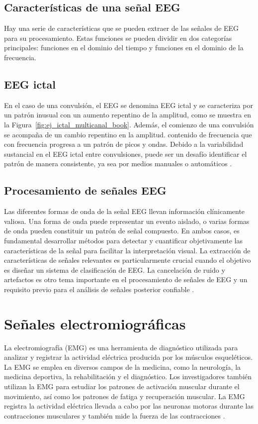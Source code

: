 \subsection{Características de una señal EEG}
Hay una serie de características que se pueden extraer de las señales de EEG para su procesamiento. Estas funciones se pueden dividir en dos categorías principales: funciones en el dominio del tiempo y funciones en el dominio de la frecuencia.

\subsection{EEG ictal}
En el caso de una convulsión, el EEG se denomina EEG ictal y se caracteriza por un patrón inusual con un aumento repentino de la amplitud, como se muestra en la Figura~\ref{fig:ej_ictal_multicanal_book}. Además, el comienzo de una convulsión se acompaña de un cambio repentino en la amplitud. contenido de frecuencia que con frecuencia progresa a un patrón de picos y ondas. Debido a la variabilidad sustancial en el EEG ictal entre convulsiones, puede ser un desafío identificar el patrón de manera consistente, ya sea por medios manuales o automáticos \cite{Libro_SP_cocoro_neuro_app}.

\subsection{Procesamiento de señales EEG}
Las diferentes formas de onda de la señal EEG llevan información clínicamente valiosa. Una forma de onda puede representar un evento aislado, o varias formas de onda pueden constituir un patrón de señal compuesto. En ambos casos, es fundamental desarrollar métodos para detectar y cuantificar objetivamente las características de la señal para facilitar la interpretación visual. La extracción de características de señales relevantes es particularmente crucial cuando el objetivo es diseñar un sistema de clasificación de EEG. La cancelación de ruido y artefactos es otro tema importante en el procesamiento de señales de EEG y un requisito previo para el análisis de señales posterior confiable \cite{Libro_SP_cocoro_neuro_app}.

\section{Señales electromiográficas}
La electromiografía (EMG) es una herramienta de diagnóstico utilizada para analizar y registrar la actividad eléctrica producida por los músculos esqueléticos. La EMG se emplea en diversos campos de la medicina, como la neurología, la medicina deportiva, la rehabilitación y el diagnóstico. Los investigadores también utilizan la EMG para estudiar los patrones de activación muscular durante el movimiento, así como los patrones de fatiga y recuperación muscular. La EMG registra la actividad eléctrica llevada a cabo por las neuronas motoras durante las contracciones musculares y también mide la fuerza de las contracciones \cite{emg_def}. 

